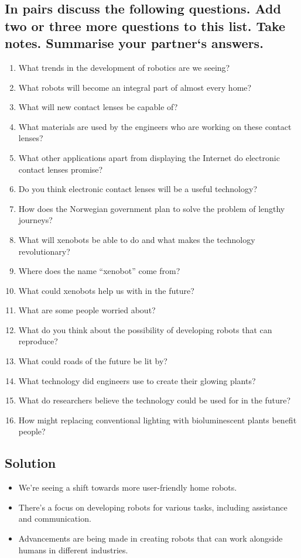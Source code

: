 \subsection*{In pairs discuss the following questions. Add two or three more questions to this list.
      Take notes. Summarise your partner`s answers.}
\begin{enumerate}
      \item What trends in the development of robotics are we seeing?
      \item What robots will become an integral part of almost every home?
      \item What will new contact lenses be capable of?
      \item What materials are used by the engineers who are working on these contact lenses?
      \item What other applications apart from displaying the Internet do electronic contact lenses promise?
      \item Do you think electronic contact lenses will be a useful technology?
      \item How does the Norwegian government plan to solve the problem of lengthy journeys?
      \item What will xenobots be able to do and what makes the technology revolutionary?
      \item Where does the name “xenobot” come from?
      \item What could xenobots help us with in the future?
      \item What are some people worried about?
      \item What do you think about the possibility of developing robots that can reproduce?
      \item What could roads of the future be lit by?
      \item What technology did engineers use to create their glowing plants?
      \item What do researchers believe the technology could be used for in the future?
      \item How might replacing conventional lighting with bioluminescent plants benefit people?
\end{enumerate}

\subsection*{Solution}
\begin{itemize}
      \item We're seeing a shift towards more user-friendly home robots.
      \item There's a focus on developing robots for various tasks, including assistance and communication.
      \item Advancements are being made in creating robots that can work alongside humans in different industries.
\end{itemize}

